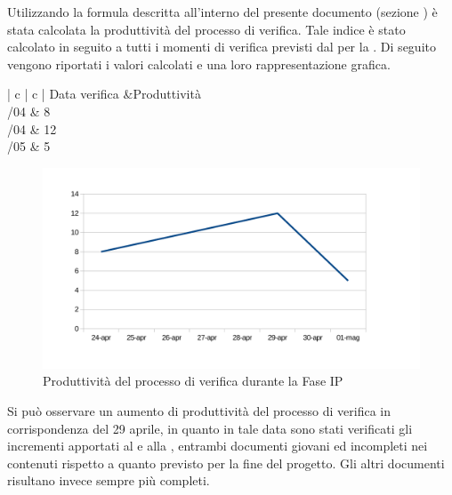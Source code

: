 	Utilizzando la formula descritta all'interno del presente documento (sezione ) è stata calcolata la produttività del processo di verifica. Tale indice è stato calcolato in seguito a tutti i momenti di verifica previsti dal  per la . Di seguito vengono riportati i valori calcolati e una loro rappresentazione grafica.
	\begin{table}[H]
		\centering
		\begin{tabu}{| c | c |}
			\hline
			Data verifica &Produttività\\ \hline {}/04 & 8 \\ /04 & 12\\ /05 & 5 \\ \hline					
		\end{tabu}
		\caption{Produttività del processo di verifica durante la fase IP}
	\end{table}
	\begin{figure}[H]
		\centering
		\includegraphics[width=12cm]{PianoDiQualifica/Pics/ProduttivitaVerificaFaseIP.pdf}
		\caption{Produttività del processo di verifica durante la Fase IP}
	\end{figure}

	Si può osservare un aumento di produttività del processo di verifica in corrispondenza del 29 aprile, in quanto in tale data sono stati verificati gli incrementi apportati al  e alla , entrambi documenti giovani ed incompleti nei contenuti rispetto a quanto previsto per la fine del progetto. Gli altri documenti risultano invece sempre più completi.

